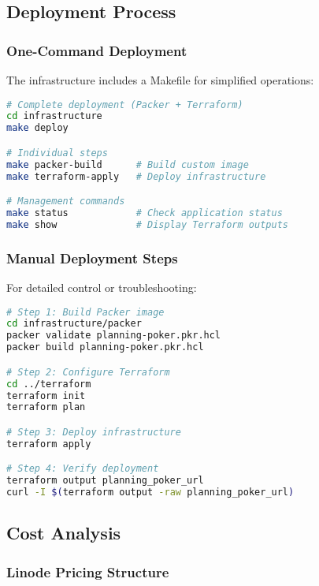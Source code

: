 \documentclass[11pt,a4paper]{article}
\begin{document}
\subsection{Deployment Process}

\subsubsection{One-Command Deployment}

The infrastructure includes a Makefile for simplified operations:

\begin{lstlisting}[language=bash, caption=Automated Deployment]
# Complete deployment (Packer + Terraform)
cd infrastructure
make deploy

# Individual steps
make packer-build      # Build custom image
make terraform-apply   # Deploy infrastructure

# Management commands
make status            # Check application status
make show              # Display Terraform outputs
\end{lstlisting}

\subsubsection{Manual Deployment Steps}

For detailed control or troubleshooting:

\begin{lstlisting}[language=bash, caption=Manual Deployment Process]
# Step 1: Build Packer image
cd infrastructure/packer
packer validate planning-poker.pkr.hcl
packer build planning-poker.pkr.hcl

# Step 2: Configure Terraform
cd ../terraform
terraform init
terraform plan

# Step 3: Deploy infrastructure
terraform apply

# Step 4: Verify deployment
terraform output planning_poker_url
curl -I $(terraform output -raw planning_poker_url)
\end{lstlisting}

\subsection{Cost Analysis}

\subsubsection{Linode Pricing Structure}
\end{document}
